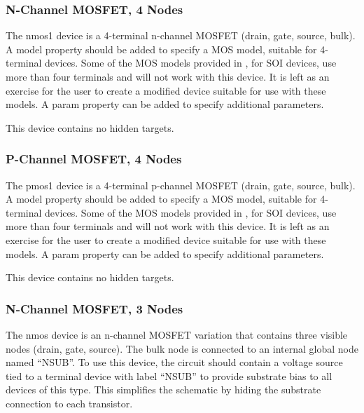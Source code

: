\subsubsection{N-Channel MOSFET, 4 Nodes}

The {\et nmos1} device is a 4-terminal n-channel MOSFET (drain, gate,
source, bulk).  A {\et model} property should be added to specify a
MOS model, suitable for 4-terminal devices.  Some of the MOS models
provided in {\WRspice}, for SOI devices, use more than four terminals
and will not work with this device.  It is left as an exercise for the
user to create a modified device suitable for use with these models. 
A {\et param} property can be added to specify additional parameters.

This device contains no hidden targets.

\subsubsection{P-Channel MOSFET, 4 Nodes}

The {\et pmos1} device is a 4-terminal p-channel MOSFET (drain, gate,
source, bulk).  A {\et model} property should be added to specify a
MOS model, suitable for 4-terminal devices.  Some of the MOS models
provided in {\WRspice}, for SOI devices, use more than four terminals
and will not work with this device.  It is left as an exercise for the
user to create a modified device suitable for use with these models. 
A {\et param} property can be added to specify additional parameters.

This device contains no hidden targets.

\subsubsection{N-Channel MOSFET, 3 Nodes}

The {\et nmos} device is an n-channel MOSFET variation that contains
three visible nodes (drain, gate, source).  The bulk node is connected
to an internal global node named ``NSUB''.  To use this device, the
circuit should contain a voltage source tied to a terminal device with
label ``NSUB'' to provide substrate bias to all devices of this type. 
This simplifies the schematic by hiding the substrate connection to
each transistor.

